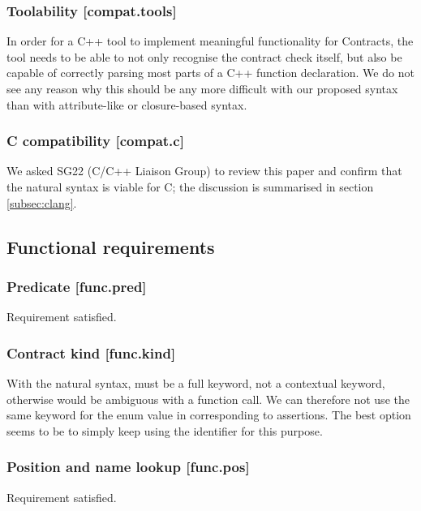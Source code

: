 \subsubsection{Toolability [compat.tools]}

In order for a C++ tool to implement meaningful functionality for Contracts, the tool needs to be able to not only recognise the contract check itself, but also be capable of correctly parsing most parts of a C++ function declaration. We do not see any reason why this should be any more difficult with our proposed syntax than with attribute-like or closure-based syntax.

\subsubsection{C compatibility  [compat.c]}

We asked SG22 (C/C++ Liaison Group) to review this paper and confirm that the natural syntax is viable for C; the discussion is summarised in section \ref{subsec:clang}.

\subsection{Functional requirements}

\subsubsection{Predicate  [func.pred]}

Requirement satisfied.

\subsubsection{Contract kind  [func.kind]}

With the natural syntax,  must be a full keyword, not a contextual keyword, otherwise  would be ambiguous with a function call. We can therefore not use the same keyword for the enum value in  corresponding to assertions. The best option seems to be to simply keep using the identifier  for this purpose.

\subsubsection{Position and name lookup [func.pos]}

Requirement satisfied.

